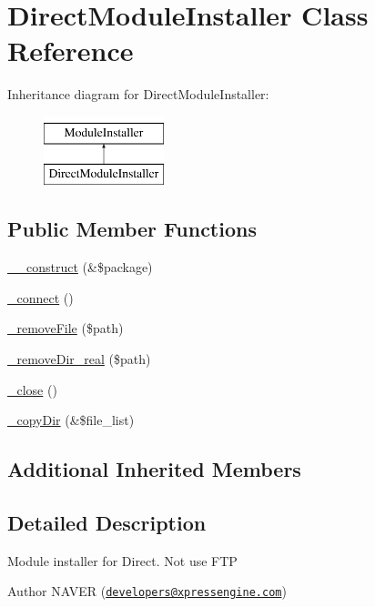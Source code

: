 \hypertarget{classDirectModuleInstaller}{\section{Direct\-Module\-Installer Class Reference}
\label{classDirectModuleInstaller}
}
Inheritance diagram for Direct\-Module\-Installer\-:\begin{figure}[H]
\begin{center}
\leavevmode
\includegraphics[height=2.000000cm]{classDirectModuleInstaller}
\end{center}
\end{figure}
\subsection*{Public Member Functions}
\begin{DoxyCompactItemize}
\item 
\hyperlink{classDirectModuleInstaller_aa371db474165dbc4e40804bd9cdc5867}{\-\_\-\-\_\-construct} (\&\$package)
\item 
\hyperlink{classDirectModuleInstaller_a8131092380fdf3c78082de11f4c83f70}{\-\_\-connect} ()
\item 
\hyperlink{classDirectModuleInstaller_a6fb855a965f6b16e450b4c97f2a79ca2}{\-\_\-remove\-File} (\$path)
\item 
\hyperlink{classDirectModuleInstaller_aec81874ceba294e9a63ad515c2a15c87}{\-\_\-remove\-Dir\-\_\-real} (\$path)
\item 
\hyperlink{classDirectModuleInstaller_acda2b7c05a32c6f9641fc24c2e3e6962}{\-\_\-close} ()
\item 
\hyperlink{classDirectModuleInstaller_acc70fcfb029792d83a577fbbebfcb918}{\-\_\-copy\-Dir} (\&\$file\-\_\-list)
\end{DoxyCompactItemize}
\subsection*{Additional Inherited Members}


\subsection{Detailed Description}
Module installer for Direct. Not use F\-T\-P \begin{DoxyAuthor}{Author}
N\-A\-V\-E\-R (\href{mailto:developers@xpressengine.com}{\tt developers@xpressengine.\-com}) 
\end{DoxyAuthor}


